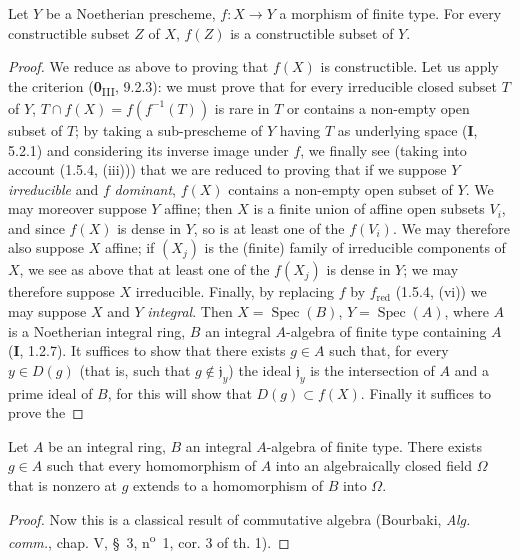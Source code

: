 \begin{corollary}[1.8.5]
\label{IV.1.8.5}
Let $Y$ be a Noetherian prescheme, $f:X\to Y$ a morphism of finite type.
For every constructible subset $Z$ of $X$, $f(Z)$ is a constructible subset
of $Y$.
\end{corollary}


\begin{proof}
We reduce as above to proving that $f(X)$ is constructible.
Let us apply the criterion (\textbf{0}\textsubscript{III}, 9.2.3): we must prove that
for every irreducible closed subset $T$ of $Y$, $T\cap f(X)=f(f^{-1}(T))$ is
rare in $T$ or contains a non-empty open subset of $T$; by taking a
sub-prescheme of $Y$ having $T$ as underlying space (\textbf{I}, 5.2.1) and
considering its inverse image under $f$, we finally see (taking into account
(1.5.4, (iii))) that we are reduced to proving that if we suppose $Y$
\emph{irreducible} and $f$ \emph{dominant}, $f(X)$ contains a non-empty open subset
of $Y$. We may moreover suppose $Y$ affine; then $X$ is a finite union of
affine open subsets $V_i$, and since $f(X)$ is dense in $Y$, so is at least
one of the $f(V_i)$. We may therefore also suppose $X$ affine; if
$(X_j)$ is the (finite) family of irreducible components of $X$, we see
as above that at least one of the $f(X_j)$ is dense in $Y$; we may therefore
suppose $X$ irreducible. Finally, by replacing $f$ by $f_{\mathrm{red}}$
(1.5.4, (vi)) we may suppose $X$ and $Y$ \emph{integral}. Then
$X=\operatorname{Spec}(B)$, $Y=\operatorname{Spec}(A)$, where $A$ is a
Noetherian integral ring, $B$ an integral $A$-algebra of finite type
containing $A$ (\textbf{I}, 1.2.7). It suffices to show that there exists $g\in A$
such that, for every $y\in D(g)$ (that is, such that $g\notin\mathfrak j_y$)
the ideal $\mathfrak j_y$ is the intersection of $A$ and a prime ideal of $B$,
for this will show that $D(g)\subset f(X)$. Finally it suffices to prove the
\end{proof}

\begin{lemma}[1.8.5.1]
\label{IV.1.8.5.1}
Let $A$ be an integral ring, $B$ an integral $A$-algebra of finite type.
There exists $g\in A$ such that every homomorphism of $A$ into an
algebraically closed field $\Omega$ that is nonzero at $g$ extends to a
homomorphism of $B$ into $\Omega$.
\end{lemma}

\begin{proof}
Now this is a classical result of commutative algebra (Bourbaki,
\emph{Alg. comm.}, chap. V, \S~3, n\textsuperscript{o}~1, cor. 3 of th. 1).
\end{proof}


